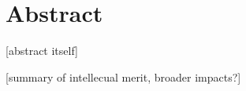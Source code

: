 

% 

\section{Abstract}


[abstract itself]

[summary of intellecual merit, broader impacts?]

\

% 

